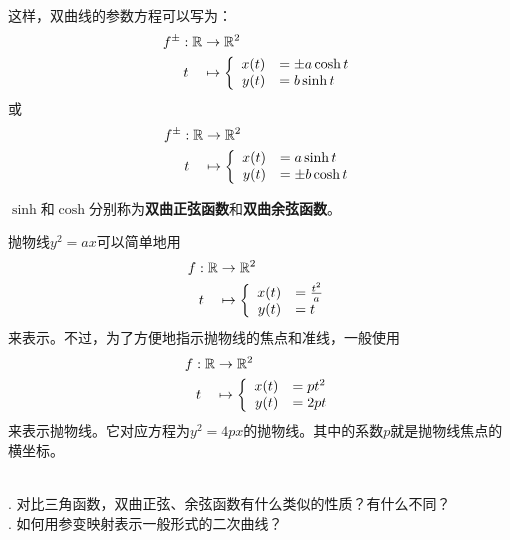 \documentclass[12pt,UTF8]{ctexbook}
\begin{document}
这样，双曲线的参数方程可以写为：
\begin{align*}
    f^{\pm}: \mathbb{R} &\rightarrow \mathbb{R}^2 \\
    t\quad &\mapsto\left\{
        \begin{array}[]{rl}
            x(t) &= \pm a\cosh{t} \\
            y(t) &= b\sinh{t} \\
        \end{array}
    \right.
\end{align*}
或
\begin{align*}
    f^{\pm}: \mathbb{R} &\rightarrow \mathbb{R}^2 \\
    t\quad &\mapsto\left\{
        \begin{array}[]{rl}
            x(t) &= a\sinh{t} \\
            y(t) &= \pm b\cosh{t} \\
        \end{array}
    \right.
\end{align*}

$\sinh$和$\cosh$分别称为\textbf{双曲正弦函数}和\textbf{双曲余弦函数}。

抛物线$y^2 = ax$可以简单地用
\begin{align*}
    f: \mathbb{R} &\rightarrow \mathbb{R}^2 \\
    t\quad &\mapsto\left\{
        \begin{array}[]{rl}
            x(t) &= \frac{t^2}{a} \\
            y(t) &= t \\
        \end{array}
    \right.
\end{align*}
来表示。不过，为了方便地指示抛物线的焦点和准线，一般使用
\begin{align*}
    f: \mathbb{R} &\rightarrow \mathbb{R}^2 \\
    t\quad &\mapsto\left\{
        \begin{array}[]{rl}
            x(t) &= pt^2 \\
            y(t) &= 2pt \\
        \end{array}
    \right.
\end{align*}
来表示抛物线。它对应方程为$y^2 = 4px$的抛物线。其中的系数$p$就是抛物线焦点的横坐标。

\begin{sk}
    \mbox{} \\
    . 对比三角函数，双曲正弦、余弦函数有什么类似的性质？有什么不同？\\
    . 如何用参变映射表示一般形式的二次曲线？\\
\end{sk}
\end{document}
